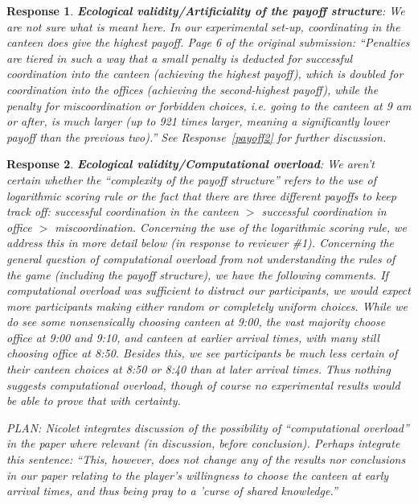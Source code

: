 \documentclass[a4paper]{article}
\newtheorem{response}{Response}
\begin{document}
\begin{response}\label{payoff1}
{\bfseries Ecological validity/Artificiality of the payoff structure}: We are not sure what is meant here. In our experimental set-up, coordinating in the canteen \emph{does} give the highest payoff. Page 6 of the original submission: ``Penalties are tiered in such a way that a small penalty is deducted for successful coordination into the canteen (achieving the highest payoff), which is doubled for coordination into the offices (achieving the second-highest payoff), while the penalty for miscoordination or forbidden choices, i.e. going to the canteen at 9 am or after, is much larger (up to 921 times larger, meaning a significantly lower payoff than the previous two).'' See Response~\ref{payoff2} for further discussion.
\end{response}
\begin{response}\label{overload1}
{\bfseries Ecological validity/Computational overload}: We aren't certain whether the ``complexity of the payoff structure'' refers to the use of logarithmic scoring rule or the fact that there are three different payoffs to keep track off: successful coordination in the canteen $>$ successful coordination in office $>$ miscoordination. Concerning the use of the logarithmic scoring rule, we address this in more detail below (in response to reviewer \#1). Concerning the general question of computational overload from not understanding the rules of the game (including the payoff structure), we have the following comments. If computational overload was sufficient to distract our participants, we would expect more participants making either random or completely uniform choices. While we do see some nonsensically choosing canteen at 9:00, the vast majority choose office at 9:00 and 9:10, and canteen at earlier arrival times, with many still choosing office at 8:50. Besides this, we see participants be much less certain of their canteen choices at 8:50 or 8:40 than at later arrival times. Thus nothing suggests computational overload, though of course no experimental results would be able to prove that with certainty. 
   
   PLAN: Nicolet integrates discussion of the possibility of ``computational overload'' in the paper where relevant (in discussion, before conclusion). Perhaps integrate this sentence: ``This, however, does not change any of the results nor conclusions in our paper relating to the player's willingness to choose the canteen at early arrival times, and thus being pray to a 'curse of shared knowledge.''
 \end{response}
\end{document}
